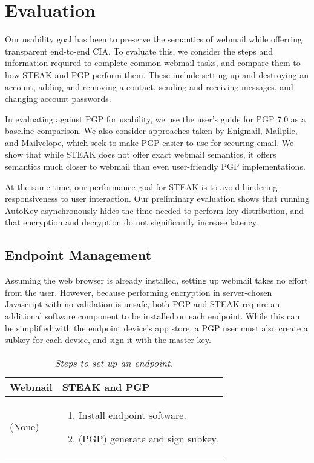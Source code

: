 \section{Evaluation}

Our usability goal has been to preserve the semantics of webmail while offerring transparent end-to-end CIA.  To evaluate this, we consider the steps and information required to complete common webmail tasks, and compare them to how STEAK and PGP perform them.  These include setting up and destroying an account, adding and removing a contact, sending and receiving messages, and changing account passwords.

In evaluating against PGP for usability, we use the user’s guide for PGP 7.0 as a baseline comparison.  We also consider approaches taken by Enigmail, Mailpile, and Mailvelope, which seek to make PGP easier to use for securing email.  We show that while STEAK does not offer exact webmail semantics, it offers semantics much closer to webmail than even user-friendly PGP implementations.

At the same time, our performance goal for STEAK is to avoid hindering responsiveness to user interaction.  Our preliminary evaluation shows that running AutoKey asynchronously hides the time needed to perform key distribution, and that encryption and decryption do not significantly increase latency.

\subsection{Endpoint Management}
Assuming the web browser is already installed, setting up webmail takes no effort from the user.  However, because performing encryption in server-chosen Javascript with no validation is unsafe, both PGP and STEAK require an additional software component to be installed on each endpoint.  While this can be simplified with the endpoint device's app store, a PGP user must also create a subkey for each device, and sign it with the master key.

\begin{table}[ht!]
\begin{tabular}{ | L{2.0cm} | L{4.5cm} |}
\hline
\textbf{Webmail} & \textbf{STEAK and PGP} \\
\hline
(None) &

\vspace{-3mm} 
\begin{enumerate}
  \item{Install endpoint software.}
  \item{(PGP) generate and sign subkey.}
\end{enumerate} \\

\hline
\end{tabular}
\caption{\it Steps to set up an endpoint.}
\label{tab:account-creation}
\end{table}

